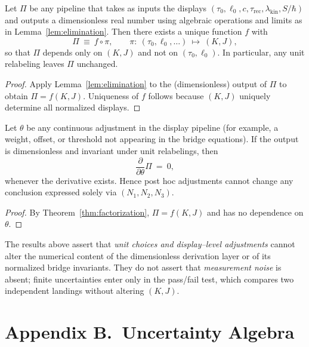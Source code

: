 \documentclass[11pt]{article}
\begin{document}
\begin{theorem}\label{thm:factorization}
Let \(\Pi\) be any pipeline that takes as inputs the displays \((\tau_{0},\ell_{0},c,\tau_{\mathrm{rec}},\lambda_{\mathrm{kin}},S/\hbar)\) and outputs a dimensionless real number using algebraic operations and limits as in Lemma~\ref{lem:elimination}. Then there exists a unique function \(f\) with
\[
\Pi\ \equiv\ f\circ \pi,\qquad \pi:\ (\tau_{0},\ell_{0},\ldots)\ \mapsto\ (K,J),
\]
so that \(\Pi\) depends only on \((K,J)\) and not on \((\tau_{0},\ell_{0})\). In particular, any unit relabeling leaves \(\Pi\) unchanged.
\end{theorem}

\begin{proof}
Apply Lemma~\ref{lem:elimination} to the (dimensionless) output of \(\Pi\) to obtain \(\Pi=f(K,J)\). Uniqueness of \(f\) follows because \((K,J)\) uniquely determine all normalized displays.
\end{proof}

\begin{corollary}
Let \(\theta\) be any continuous adjustment in the display pipeline (for example, a weight, offset, or threshold not appearing in the bridge equations). If the output is dimensionless and invariant under unit relabelings, then
\[
\frac{\partial}{\partial\theta}\Pi\ =\ 0,
\]
whenever the derivative exists. Hence post hoc adjustments cannot change any conclusion expressed solely via \((N_{1},N_{2},N_{3})\).
\end{corollary}

\begin{proof}
By Theorem~\ref{thm:factorization}, \(\Pi=f(K,J)\) and has no dependence on \(\theta\).
\end{proof}

\begin{remark}
The results above assert that \emph{unit choices and display–level adjustments} cannot alter the numerical content of the dimensionless derivation layer or of its normalized bridge invariants. They do not assert that \emph{measurement noise} is absent; finite uncertainties enter only in the pass/fail test, which compares two independent landings without altering \((K,J)\).
\end{remark}

\section*{Appendix B.\ Uncertainty Algebra}
\end{document}
